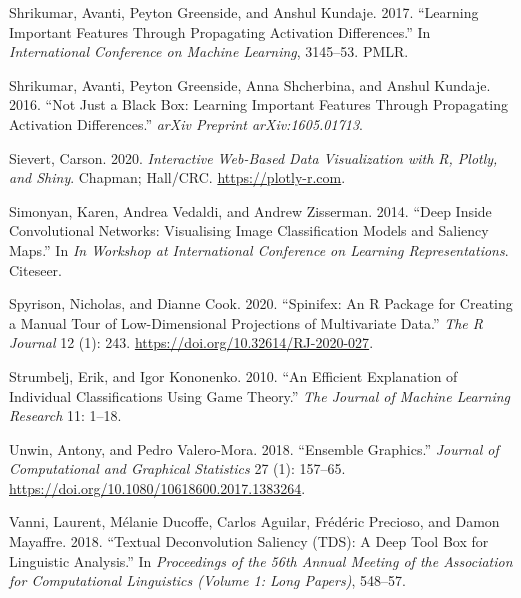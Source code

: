 \documentclass[11pt,twoside]{article}
\newlength{\cslhangindent}
\newlength{\cslentryspacingunit} %
\newenvironment{CSLReferences}[2] %
 {%
  \setlength{\parindent}{0pt}
  \ifodd #1
  \let\oldpar\par
  \def\par{\hangindent=\cslhangindent\oldpar}
  \fi
  \setlength{\parskip}{#2\cslentryspacingunit}
 }%
 {}
\begin{document}
\begin{CSLReferences}{1}{0}
\leavevmode{}%
Shrikumar, Avanti, Peyton Greenside, and Anshul Kundaje. 2017. {``Learning Important Features Through Propagating Activation Differences.''} In \emph{International {Conference} on {Machine} {Learning}}, 3145--53. PMLR.

\leavevmode{}%
Shrikumar, Avanti, Peyton Greenside, Anna Shcherbina, and Anshul Kundaje. 2016. {``Not Just a Black Box: {Learning} Important Features Through Propagating Activation Differences.''} \emph{arXiv Preprint arXiv:1605.01713}.

\leavevmode{}%
Sievert, Carson. 2020. \emph{Interactive {Web}-{Based} {Data} {Visualization} with {R}, Plotly, and Shiny}. Chapman; Hall/CRC. \url{https://plotly-r.com}.

\leavevmode{}%
Simonyan, Karen, Andrea Vedaldi, and Andrew Zisserman. 2014. {``Deep Inside Convolutional Networks: {Visualising} Image Classification Models and Saliency Maps.''} In \emph{In {Workshop} at {International} {Conference} on {Learning} {Representations}}. Citeseer.

\leavevmode{}%
Spyrison, Nicholas, and Dianne Cook. 2020. {``Spinifex: An {R} {Package} for {Creating} a {Manual} {Tour} of {Low}-Dimensional {Projections} of {Multivariate} {Data}.''} \emph{The R Journal} 12 (1): 243. \url{https://doi.org/10.32614/RJ-2020-027}.

\leavevmode{}%
Strumbelj, Erik, and Igor Kononenko. 2010. {``An Efficient Explanation of Individual Classifications Using Game Theory.''} \emph{The Journal of Machine Learning Research} 11: 1--18.

\leavevmode{}%
Unwin, Antony, and Pedro Valero-Mora. 2018. {``Ensemble {Graphics}.''} \emph{Journal of Computational and Graphical Statistics} 27 (1): 157--65. \url{https://doi.org/10.1080/10618600.2017.1383264}.

\leavevmode{}%
Vanni, Laurent, Mélanie Ducoffe, Carlos Aguilar, Frédéric Precioso, and Damon Mayaffre. 2018. {``Textual {Deconvolution} {Saliency} ({TDS}): A Deep Tool Box for Linguistic Analysis.''} In \emph{Proceedings of the 56th {Annual} {Meeting} of the {Association} for {Computational} {Linguistics} ({Volume} 1: {Long} {Papers})}, 548--57.


\end{CSLReferences}
\end{document}
